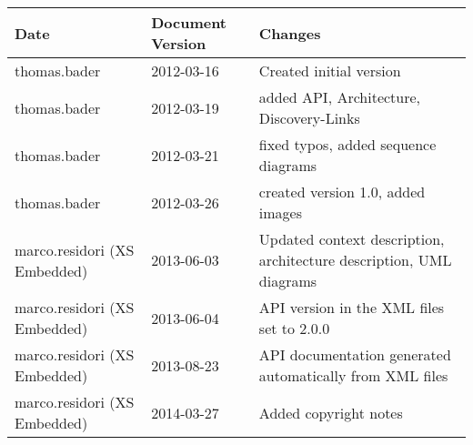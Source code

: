 \documentclass[a4paper]{article}
\begin{document}
\begin{titlepage}
\begin{tabular}{ | l | l | p{9.5cm} | }
\hline
Date & Document Version & Changes \\
\hline
thomas.bader & 2012-03-16 & Created initial version \\
\hline
thomas.bader & 2012-03-19 & added API, Architecture, Discovery-Links \\
\hline
thomas.bader & 2012-03-21 & fixed typos, added sequence diagrams \\
\hline
thomas.bader & 2012-03-26 & created version 1.0, added images \\
\hline
marco.residori (XS Embedded) & 2013-06-03 & Updated context description, architecture description, UML diagrams \\
\hline
marco.residori (XS Embedded) & 2013-06-04 & API version in the XML files set to 2.0.0 \\
\hline
marco.residori (XS Embedded) & 2013-08-23 & API documentation generated automatically from XML files \\
\hline
marco.residori (XS Embedded) & 2014-03-27 & Added copyright notes \\
\hline
\end{tabular}


\end{titlepage}
\clearemptydoublepage
{}
\tableofcontents
\clearemptydoublepage
{}
\hypersetup{pageanchor=true}
\end{document}
